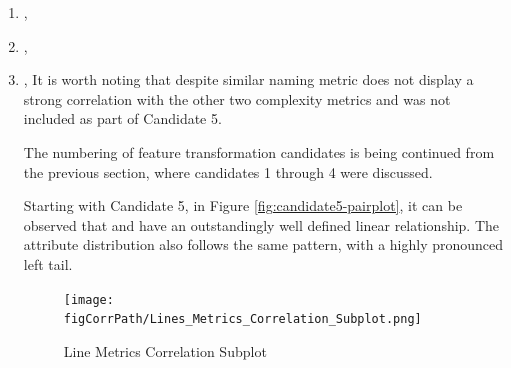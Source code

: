 \begin{enumerate}
\FloatBarrier
\textbf{In conclusion} all features investigated in this section have displayed high positive relationship with one another, very strong linear relationship as well as almost perfectly aligned data distribution. Therefore, only 4 of the 10 attributes, enumerated in section \ref{lst:code-coverage-candidates}, have been retained:

\begin{itemize}
    \item \overallBranchCoverage{}
    \item \overallUncoveredLines{}
    \item \overallCoverage{}
    \item \overallUncoveredConditions{}
\end{itemize}

\paragraph{Line and complexity features}\label{sec:impl-data-analysis:corr:line-and-complexity}
In the following section, a number off attributes will be investigated with regards to the possibility of transforming said features and reducing the dimensionality of the overall dataset. Given a subplot of a heatmap presented in Figure \ref{fig:correlation-line-metrics-subplot} the attributes under analysis are, based on their high correlation:
    \item \complexity{}, \fileComplexity{}    \item \statements{}, \linesToCover{}
    \item \ncloc{}, \lines{}
It is worth noting that despite similar naming \functionComplexity{} metric does not display a strong correlation with the other two complexity metrics and was not included  as part of Candidate 5.

The numbering of feature transformation candidates is being continued from the previous section, where candidates 1 through 4 were discussed.

Starting with Candidate 5, in Figure \ref{fig:candidate5-pairplot}, it can be observed that \complexity{} and \fileComplexity{} have an outstandingly well defined linear relationship. The attribute distribution also follows the same pattern, with a highly pronounced left tail. 

\begin{figure}
    \centering
    \texttt{[image: \\figCorrPath/Lines\_Metrics\_Correlation\_Subplot.png]}
    \caption{Line Metrics Correlation Subplot}
    \label{fig:correlation-line-metrics-subplot}
\end{figure}


\end{enumerate}

